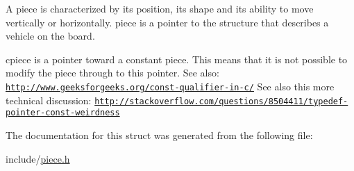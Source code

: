 A piece is characterized by its position, its shape and its ability to move vertically or horizontally. piece is a pointer to the structure that describes a vehicle on the board.

cpiece is a pointer toward a constant piece. This means that it is not possible to modify the piece through to this pointer. See also\+: \href{http://www.geeksforgeeks.org/const-qualifier-in-c/}{\tt http\+://www.\+geeksforgeeks.\+org/const-\/qualifier-\/in-\/c/} See also this more technical discussion\+: \href{http://stackoverflow.com/questions/8504411/typedef-pointer-const-weirdness}{\tt http\+://stackoverflow.\+com/questions/8504411/typedef-\/pointer-\/const-\/weirdness} 

The documentation for this struct was generated from the following file\+:\begin{DoxyCompactItemize}
\item 
include/\hyperlink{piece_8h}{piece.\+h}\end{DoxyCompactItemize}
